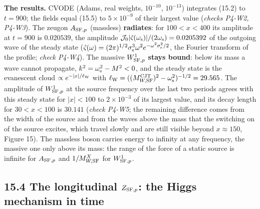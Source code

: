 \documentclass[
  10pt,
]{article}
\begin{document}
\textbf{The results.} CVODE (Adams, real weights, \(10^{-10}\),
\(10^{-13}\)) integrates (15.2) to \(t=900\); the fields equal (15.5) to
\(5\times10^{-9}\) of their largest value (\emph{checks P4-W2, P4-W3}).
The zeugon \(A_{{\rm SF},p}\) (massless) \textbf{radiates}: for
\(100<x<400\) its amplitude at \(t=900\) is \(0.020539\), the amplitude
\(\mathcal J_0\lvert\hat\varsigma(\omega_{\rm s})\rvert/(2\omega_{\rm s})=0.0205392\)
of the outgoing wave of the steady state
(\(\hat\varsigma(\omega)=(2\pi)^{1/2}\sigma_{\rm s}^3\omega^2e^{-\omega^2\sigma_{\rm s}^2/2}\),
the Fourier transform of the profile; \emph{check P4-W4}). The massive
\(W^1_{{\rm SF},p}\) \textbf{stays bound}: below its mass a wave cannot
propagate, \(k^2=\omega_{\rm s}^2-M^2<0\), and the steady state is the
evanescent cloud \(\propto e^{-\lvert x\rvert/\ell_{\rm W}}\) with
\(\ell_{\rm W}=((M^{\rm CJT}_{W,{\rm SF}})^2-\omega_{\rm s}^2)^{-1/2}=29.565\).
The amplitude of \(W^1_{{\rm SF},p}\) at the source frequency over the
last two periods agrees with this steady state for
\(\lvert x\rvert<100\) to \(2\times10^{-3}\) of its largest value, and
its decay length for \(30<x<100\) is \(30.141\) (\emph{check P4-W5}; the
remaining difference comes from the width of the source and from the
waves above the mass that the switching on of the source excites, which
travel slowly and are still visible beyond \(x\approx150\), Figure 15).
The massless boson carries energy to infinity at any frequency, the
massive one only above its mass: the range of the force of a static
source is infinite for \(A_{{\rm SF},p}\) and \(1/M^X_{W,{\rm SF}}\) for
\(W^1_{{\rm SF},p}\).

\hypertarget{the-longitudinal-z_rm-sfp-the-higgs-mechanism-in-time}{%
\subsection{\texorpdfstring{15.4 The longitudinal \(Z_{{\rm SF},p}\):
the Higgs mechanism in
time}{15.4 The longitudinal Z\_\{\{\textbackslash rm SF\},p\}: the Higgs mechanism in time}}\label{the-longitudinal-z_rm-sfp-the-higgs-mechanism-in-time}}
\end{document}
